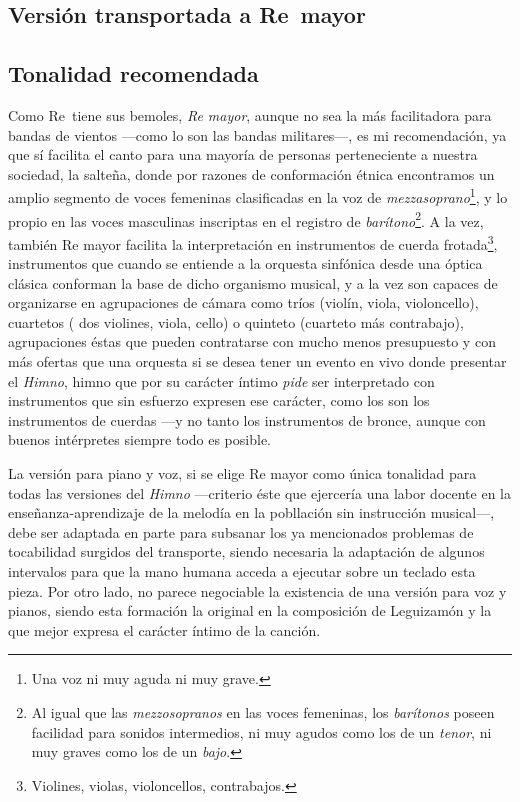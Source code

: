 \subsection[Versión transportada a Re\bemoltxt\ mayor]{Versión transportada a Re\bemol\ mayor}
\label{subsec:transporte-reb}



\subsection{Tonalidad recomendada}
\label{subsec:tonalidad-recomendada}

Como Re\bemoltxt\ tiene sus bemoles, \emph{Re mayor}, aunque no sea la más facilitadora para bandas de vientos ---como lo son las bandas militares---, es mi recomendación, ya que sí facilita el canto para una mayoría de personas perteneciente a nuestra sociedad, la salteña, donde por razones de conformación étnica encontramos un amplio segmento de voces femeninas clasificadas en la voz de \emph{mezzasoprano}\footnote{Una voz ni muy aguda ni muy grave.}, y lo propio en las voces masculinas inscriptas en el registro de \emph{barítono}\footnote{Al igual que las \emph{mezzosopranos} en las voces femeninas, los \emph{barítonos} poseen facilidad para sonidos intermedios, ni muy agudos como los de un \emph{tenor}, ni muy graves como los de un \emph{bajo}.}. A la vez, también Re mayor facilita la interpretación en instrumentos de cuerda frotada\footnote{Violines, violas, violoncellos, contrabajos.}, instrumentos que cuando se entiende a la orquesta sinfónica desde una óptica clásica conforman la base de dicho organismo musical, y a la vez son capaces de organizarse en agrupaciones de cámara como tríos (violín, viola, violoncello), cuartetos ( dos violines, viola, cello) o quinteto (cuarteto más contrabajo), agrupaciones éstas que pueden contratarse con mucho menos presupuesto y con más ofertas que una orquesta si se desea tener un evento en vivo donde presentar el \emph{Himno}, himno que por su carácter íntimo \emph{pide} ser interpretado con instrumentos que sin esfuerzo expresen ese carácter, como los son los instrumentos de cuerdas ---y no tanto los instrumentos de bronce, aunque con buenos intérpretes siempre todo es posible.

La versión para piano y voz, si se elige Re mayor como única tonalidad para todas las versiones del \emph{Himno} ---criterio éste que ejercería una labor docente en la enseñanza-aprendizaje de la melodía en la pobllación sin instrucción musical---, debe ser adaptada en parte para subsanar los ya mencionados problemas de tocabilidad surgidos del transporte, siendo necesaria la adaptación de algunos intervalos para que la mano humana acceda a ejecutar sobre un teclado esta pieza. Por otro lado, no parece negociable la existencia de una versión para voz y pianos, siendo esta formación la original en la composición de Leguizamón y la que mejor expresa el carácter íntimo de la canción.


